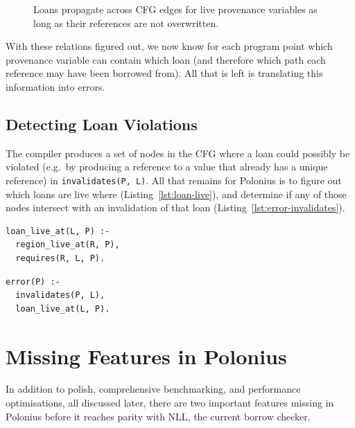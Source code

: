\documentclass[11pt,a4paper,twoside,openany]{report}
\newenvironment{sourcecode}{\captionsetup{type=listing}}{}
\newcommand{\InDatalog}[1]{\texttt{#1}}
\renewcommand\_{\textunderscore\allowbreak}
\begin{document}
\begin{figure}
  \caption[Rule for Propagating Loans Across CFG Edges]{Loans propagate across
    CFG edges for live provenance variables as long as their references are not
    overwritten.}\label{fig:requires-edge}
\end{figure}

With these relations figured out, we now know for each program point which
provenance variable can contain which loan (and therefore which path each
reference may have been borrowed from). All that is left is translating this
information into errors.

\subsection{Detecting Loan Violations}

The compiler produces a set of nodes in the CFG where a loan could possibly be
violated (e.g.\ by producing a reference to a value that already has a unique
reference) in \InDatalog{invalidates(P, L)}. All that remains for Polonius is to
figure out which loans are live where (Listing~\ref{lst:loan-live}), and
determine if any of those nodes intersect with an invalidation of that loan
(Listing~\ref{lst:error-invalidates}).

\begin{sourcecode}
  \label{lst:loan-live}
\begin{verbatim}
loan_live_at(L, P) :-
  region_live_at(R, P),
  requires(R, L, P).
\end{verbatim}
\end{sourcecode}

\begin{sourcecode}
  \label{lst:error-invalidates}
\begin{verbatim}
error(P) :-
  invalidates(P, L),
  loan_live_at(L, P).
\end{verbatim}
\end{sourcecode}

\section{Missing Features in Polonius}\label{sec:missing-features}

In addition to polish, comprehensive benchmarking, and performance
optimisations, all discussed later, there are two important features missing
in Polonius before it reaches parity with NLL, the current borrow checker.
\end{document}

